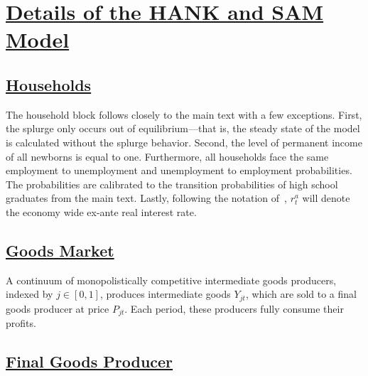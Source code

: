 \documentclass[\latexroot/\projectname]{subfiles}
\begin{document}
\FloatBarrier

\section{\href{https://econ-ark.github.io/HAFiscal/\#sec:appendix-hank}{Details of the HANK and SAM Model}}
\whenintegrated{\label{sec:appendix-hank}} 


\subsection{\href{https://econ-ark.github.io/HAFiscal/\#sec:hank-households}{Households}}\whenintegrated{\label{sec:hank-households}}

The household block follows closely to the main text with a few exceptions. First, the splurge only occurs out of equilibrium---that is, the steady state of the model is calculated without the splurge behavior. Second, the level of permanent income of all newborns is equal to one. Furthermore, all households face the same employment to unemployment and unemployment to employment probabilities. The probabilities are calibrated to the transition probabilities of high school graduates from the main text. Lastly, following the notation of~\cite{arsJumpsHumps}, $r^{a}_{t}$ will denote the economy wide ex-ante real interest rate.

\subsection{\href{https://econ-ark.github.io/HAFiscal/\#sec:goods-market}{Goods Market}}\whenintegrated{\label{sec:goods-market}}

A continuum of monopolistically competitive intermediate goods producers, indexed by \( j \in [0,1] \), produces intermediate goods \( Y_{jt} \), which are sold to a final goods producer at price \( P_{jt} \). Each period, these producers fully consume their profits.

\subsection{\href{https://econ-ark.github.io/HAFiscal/\#sec:hank-final-goods-producer}{Final Goods Producer}}\whenintegrated{\label{sec:hank-final-goods-producer}}
\end{document}
